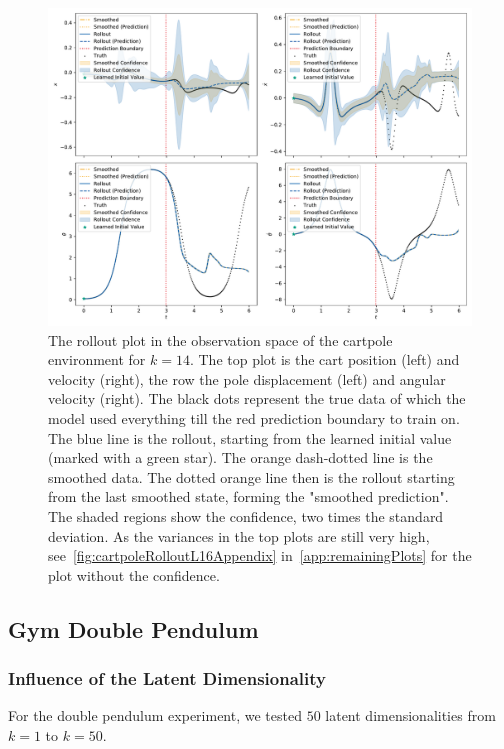 			\begin{figure}
				\centering
				\includegraphics[width=\linewidth]{figures/results/cartpole-gym/run-latent-dim-16/rollout-observations-N0.pdf}
				\caption{The rollout plot in the observation space of the cartpole environment for \(k = 14\). The top plot is the cart position (left) and velocity (right), the row the pole displacement (left) and angular velocity (right). The black dots represent the true data of which the model used everything till the red prediction boundary to train on. The blue line is the rollout, starting from the learned initial value (marked with a green star). The orange dash-dotted line is the smoothed data. The dotted orange line then is the rollout starting from the last smoothed state, forming the "smoothed prediction". The shaded regions show the confidence, \ie two times the standard deviation. As the variances in the top plots are still very high, see~\autoref{fig:cartpoleRolloutL16Appendix} in~\autoref{app:remainingPlots} for the plot without the confidence.}
				\label{fig:cartpoleRolloutL16}
			\end{figure}

	\subsection{Gym Double Pendulum} %

		\subsubsection{Influence of the Latent Dimensionality}
			For the double pendulum experiment, we tested \(50\) latent dimensionalities from \( k = 1 \) to \( k = 50 \).

